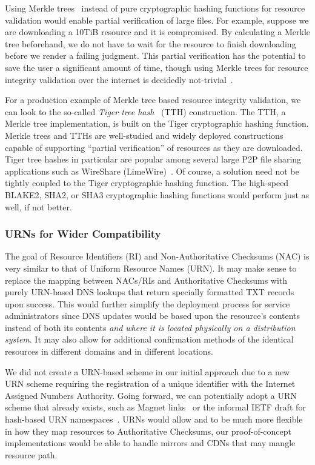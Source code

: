 Using Merkle trees~\cite{Merkle} instead of pure cryptographic hashing functions
for resource validation would enable partial verification of large files. For
example, suppose we are downloading a 10TiB resource and it is compromised. By
calculating a Merkle tree beforehand, we do not have to wait for the resource to
finish downloading before we render a failing judgment. This partial
verification has the potential to save the user a significant amount of time,
though using Merkle trees for resource integrity validation over the internet is
decidedly not-trivial~\cite{Merkle-HTTP}.

For a production example of Merkle tree based resource integrity validation, we
can look to the so-called \emph{Tiger tree hash}~\cite{TTH, Merkle} (TTH)
construction. The TTH, a Merkle tree implementation, is built on the Tiger
cryptographic hashing function. Merkle trees and TTHs are well-studied and
widely deployed constructions capable of supporting ``partial verification'' of
resources as they are downloaded. Tiger tree hashes in particular are popular
among several large P2P file sharing applications such as WireShare
(LimeWire)~\cite{LimeWire}. Of course, a solution need not be tightly coupled to
the Tiger cryptographic hashing function. The high-speed BLAKE2, SHA2, or SHA3
cryptographic hashing functions would perform just as well, if not better.

\subsubsection{URNs for Wider Compatibility}

The goal of Resource Identifiers (RI) and Non-Authoritative Checksums (NAC) is
very similar to that of Uniform Resource Names (URN). It may make sense to
replace the mapping between NACs/RIs and Authoritative Checksums with purely
URN-based DNS lookups that return specially formatted TXT records upon success.
This would further simplify the deployment process for service administrators
since DNS updates would be based upon the resource's contents instead of both
its contents \textit{and where it is located physically on a distribution
system}. It may also allow for additional confirmation methods of the identical
resources in different domains and in different locations.

We did not create a URN-based scheme in our initial approach due to a new URN
scheme requiring the registration of a unique identifier with the Internet
Assigned Numbers Authority. Going forward, we can potentially adopt a URN scheme
that already exists, such as Magnet links~\cite{MagnetLinks} or the informal
IETF draft for hash-based URN namespaces~\cite{draft-URN}. URNs would allow
\DNSSYS{} and \DHTSYS{} to be much more flexible in how they map resources to
Authoritative Checksums, \ie our proof-of-concept implementations would be able
to handle mirrors and CDNs that may mangle resource path.
